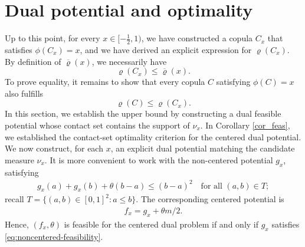 \documentclass{article}
\begin{document}
\section{Dual potential and optimality}\label{sec:dual}


Up to this point, for every \(x\in[-\frac12,1)\), we have constructed a copula \(C_x\) that satisfies \(\phi(C_x)=x\), and we have derived an explicit expression for \(\varrho(C_x)\).
By definition of \(\overline{\varrho}(x)\), we necessarily have
\[
\varrho(C_x)\leq\overline{\varrho}(x).
\]
To prove equality, it remains to show that every copula \(C\) satisfying \(\phi(C)=x\) also fulfills
\[
\varrho(C)\leq\varrho(C_x).
\]
In this section, we establish the upper bound by constructing a dual feasible potential whose contact set contains the support of \(\nu_x\).
In Corollary \ref{cor_feas}, we established the contact-set optimality criterion for the centered dual potential.
We now construct, for each \(x\), an explicit dual potential matching the candidate measure \(\nu_x\).
It is more convenient to work with the non-centered potential \(g_x\), satisfying
\begin{align}\label{eq:noncentered-feasibility}
    g_x(a) + g_x(b) + \theta(b-a) \leq (b-a)^2 \quad \text{for all } (a,b)\in T;
\end{align}
recall \(T=\{(a,b)\in[0,1]^2:a\leq b\}\).
The corresponding centered potential is
\begin{align*}
    f_x = g_x + \theta m/2.
\end{align*}
Hence, \((f_x,\theta)\) is feasible for the centered dual problem if and only if \(g_x\) satisfies \eqref{eq:noncentered-feasibility}.
\end{document}
